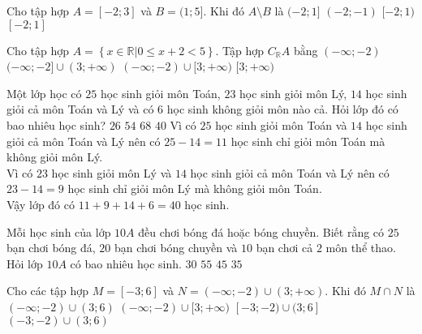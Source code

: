 \begin{ex}%
	Cho tập hợp $ A=[-2;3] $ và $ B=(1;5] $. Khi đó $ A\setminus B $ là
	\choice
	{$(-2;1]$}
	{$(-2;-1)$}
	{$[-2;1) $}
	{\True $[-2;1]$}
	\loigiai{
		Ta có $ A\setminus B =[-2;3]\setminus(1;5]= [-2;1]$. 
	}
\end{ex}

 \begin{ex}%
 	Cho tập hợp $A=\left\{x \in \mathbb{R} |  0 \le x+2 <5 \right\}$. Tập hợp $C_{\mathbb{R}}A$ bằng
 	\choice
 	{$(-\infty;-2)$}
 	{$(-\infty;-2] \cup (3;+\infty)$}
 	{\True $(-\infty;-2) \cup [3;+\infty)$}
 	{$[3;+\infty)$}
 	\loigiai{
 		Ta có: $C_{\mathbb{R}}A=(-\infty;-2) \cup [3;+\infty)$.}
 \end{ex}
\begin{ex}%
	Một lớp học có $25$ học sinh giỏi môn Toán, $23$ học sinh giỏi môn Lý, $14$ học sinh giỏi cả môn Toán và Lý và có $6$ học sinh không giỏi môn nào cả. Hỏi lớp đó có bao nhiêu học sinh?
	\choice
	{$26$}
	{$54$}
	{$68$}
	{\True $40$}
	\loigiai
	{
		Vì có $25$ học sinh giỏi môn Toán và $14$ học sinh giỏi cả môn Toán và Lý nên có $25-14=11$ học sinh chỉ giỏi môn Toán mà không giỏi môn Lý. \\
		Vì có $23$ học sinh giỏi môn Lý và $14$ học sinh giỏi cả môn Toán và Lý nên có $23-14=9$ học sinh chỉ giỏi môn Lý mà không giỏi môn Toán. \\
		Vậy lớp đó có $11+9+14+6=40$ học sinh.
	}
\end{ex}
\begin{ex}%
	Mỗi học sinh của lớp $10A$ đều chơi bóng đá hoặc bóng chuyền. Biết rằng có $25$ bạn chơi bóng đá, $20$ bạn chơi bóng chuyền và $10$ bạn chơi cả $2$ môn thể thao. Hỏi lớp $10A$ có bao nhiêu học sinh.
	\choice
	{$30$}
	{$55$}
	{$45$}
	{\True $35$}
\end{ex}
\begin{ex}%
	Cho các tập hợp $M=[-3;6]$ và $N=(-\infty; -2)\cup (3;+\infty)$. Khi đó $M\cap N$ là
	\choice
	{$(-\infty;-2)\cup (3;6)$}
	{$(-\infty;-2)\cup [3;+\infty)$}
	{\True $[-3;-2)\cup (3;6]$}
	{$(-3;-2)\cup (3;6)$}
\end{ex}

